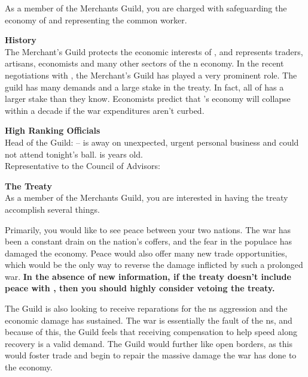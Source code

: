 \documentclass[blue]{NeptuneBall}
\begin{document}
\name{\bMerchant{}}

As a member of the Merchants Guild, you are charged with safeguarding the economy of \pAtlantis{} and representing the common worker.

{\bf History}\\
The Merchant's Guild protects the economic interests of \pAtlantis{}, and represents traders, artisans, economists and many other sectors of the \pAtlantis{}n economy. In the recent negotiations with \pPacifica{}, the Merchant's Guild has played a very prominent role. The guild has many demands and a large stake in the treaty. In fact, all of \pAtlantis{} has a larger stake than they know. Economists predict that \pAtlantis{}'s economy will collapse within a decade if the war expenditures aren't curbed.

{\bf High Ranking Officials}\\
Head of the Guild: \cNautilus{} -- \cNautilus{} is away on unexpected, urgent personal business and could not attend tonight's ball. \cNautilus{} is \cNautilus{\MYnumber} years old.\\
Representative to the Council of Advisors: \cSlave{}

{\bf The Treaty}\\
As a member of the Merchants Guild, you are interested in having the treaty accomplish several things. 

Primarily, you would like to see peace between your two nations. The war has been a constant drain on the nation's coffers, and the fear in the populace has damaged the economy. Peace would also offer many new trade opportunities, which would be the only way to reverse the damage inflicted by such a prolonged war. {\bf In the absence of new information, if the treaty doesn't include peace with \pPacifica{}, then you should highly consider vetoing the treaty.}

The Guild is also looking to receive reparations for the \pPacifica{}ns aggression and the economic damage \pAtlantis{} has sustained. The war is essentially the fault of the \pPacifica{}ns, and because of this, the Guild feels that receiving compensation to help speed along recovery is a valid demand. The Guild would further like open borders, as this would foster trade and begin to repair the massive damage the war has done to the economy.
\end{document}
